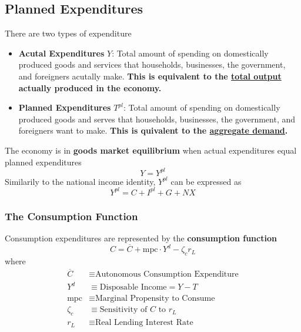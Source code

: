 \documentclass[a4paper]{article}
\begin{document}
\subsection{Planned Expenditures}
There are two types of expenditure \begin{itemize}
    \item \textbf{Acutal Expenditures} $Y$: Total amount of spending on 
    domestically produced goods and services that households, businesses, the 
    government, and foreigners acutally make. \textbf{This is equivalent to the \underline{total 
    output} actually produced in the economy.}
    \item \textbf{Planned Expenditures} $T^{pl}$: Total amount of spending on 
    domestically produced goods and serves that households, businesses, the 
    government, and foreigners want to make. \textbf{This is quivalent to the 
    \underline{aggregate demand}.}
\end{itemize}
The economy is in \textbf{goods market equilibrium} when actual expenditures equal planned 
expenditures
\[ Y = Y^{pl} \]
Similarily to the national income identity, $Y^{pl}$ can be expressed as
\[ Y^{pl} = C + I^{pl} + G + NX \]

\subsubsection*{The Consumption Function}
Consumption expenditures are represented by the \textbf{consumption function}
\[ C = \overline{C} + \text{mpc} \cdot Y^d - \zeta_c  r_L \]
where
\begin{align*}
    \overline{C} &\equiv \text{Autonomous Consumption Expenditure} \\
    Y^d &\equiv \text{Disposable Income} = Y - T \\
    \text{mpc} &\equiv \text{Marginal Propensity to Consume} \\
    \zeta_c &\equiv \text{Sensitivity of $C$ to $r_L$} \\
    r_L &\equiv \text{Real Lending Interest Rate}
\end{align*}
\end{document}
